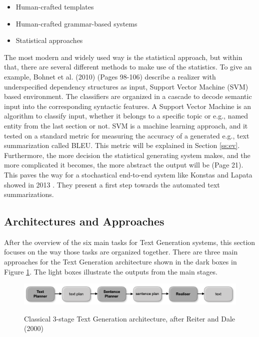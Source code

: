 \begin{itemize}
	\item Human-crafted templates
	\item Human-crafted grammar-based systems
	\item Statistical approaches
\end{itemize}

The most modern and widely used way is the statistical approach, but within that, there are several different methods to make use of the statistics. To give an example, Bohnet et al. (2010) \cite{bohnet-etal-2010-broad} (Pages 98-106) describe a realizer with underspecified dependency structures as input, Support Vector Machine (SVM) based environment. The classifiers are organized in a cascade to decode semantic input into the corresponding syntactic features. A Support Vector Machine is an algorithm to classify input, whether it belongs to a specific topic or e.g., named entity from the last section or not. SVM is a machine learning approach, and it tested on a standard metric for measuring the accuracy of a generated e.g., text summarization called BLEU. This metric will be explained in Section \ref{ss:ev}.
Furthermore, the more decision the statistical generating system makes, and the more complicated it becomes, the more abstract the output will be \cite{gall} (Page 21). This paves the way for a stochastical end-to-end system like Konstas and Lapata showed in 2013 \cite{Konstas:Lapata:2013}. They present a first step towards the automated text summarizations.

\subsection{Architectures and Approaches}\label{ss:archi}

After the overview of the six main tasks for Text Generation systems, this section focuses on the way those tasks are organized together. There are three main approaches for the Text Generation architecture shown in the dark boxes in Figure \ref{architecture}. The light boxes illustrate the outputs from the main stages.

\begin{figure}
	\begin{center}
		\includegraphics[width=6in]{photos/architecture}\\
		\caption{Classical 3-stage Text Generation architecture, after Reiter and Dale (2000) \cite{reiter2} }\label{architecture}
	\end{center}
\end{figure}

